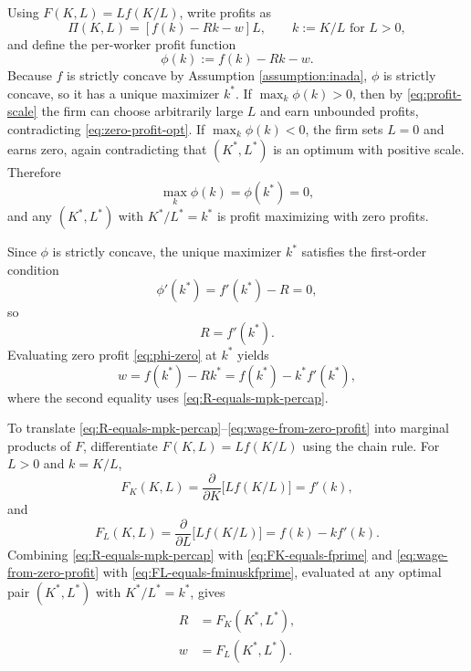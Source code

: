 \documentclass[\topdir/lecture\_notes.tex]{subfiles}
\begin{document}
Using \(F(K,L)=L f(K/L)\), write profits as
\begin{equation}
  \Pi(K,L)=[f(k)-Rk-w]L,\qquad k:=K/L \text{ for } L>0,
  \label{eq:profit-scale}
\end{equation}
and define the per-worker profit function
\begin{equation*}
  \phi(k):=f(k)-Rk-w.
\end{equation*}
Because \(f\) is strictly concave by Assumption \ref{assumption:inada}, \(\phi\) is strictly concave, so it has a unique maximizer \(k^{*}\).
If \(\max_{k}\phi(k)>0\), then by \eqref{eq:profit-scale} the firm can choose arbitrarily large \(L\) and earn unbounded profits, contradicting \eqref{eq:zero-profit-opt}.
If \(\max_{k}\phi(k)<0\), the firm sets \(L=0\) and earns zero, again contradicting that \((K^{*},L^{*})\) is an optimum with positive scale.
Therefore
\begin{equation}
  \max_{k}\phi(k)=\phi(k^{*})=0,
  \label{eq:phi-zero}
\end{equation}
and any \((K^{*},L^{*})\) with \(K^{*}/L^{*}=k^{*}\) is profit maximizing with zero profits.

Since \(\phi\) is strictly concave, the unique maximizer \(k^{*}\) satisfies the first-order condition
\begin{equation*}
  \phi'(k^{*})=f'(k^{*})-R=0,
\end{equation*}
so
\begin{equation}
  R=f'(k^{*}).
  \label{eq:R-equals-mpk-percap}
\end{equation}
Evaluating zero profit \eqref{eq:phi-zero} at \(k^{*}\) yields
\begin{equation}
  w=f(k^{*})-Rk^{*}=f(k^{*})-k^{*} f'(k^{*}),
  \label{eq:wage-from-zero-profit}
\end{equation}
where the second equality uses \eqref{eq:R-equals-mpk-percap}.

To translate \eqref{eq:R-equals-mpk-percap}--\eqref{eq:wage-from-zero-profit} into marginal products of \(F\), differentiate \(F(K,L)=L f(K/L)\) using the chain rule. For \(L>0\) and \(k=K/L\),
\begin{equation}
  F_{K}(K,L)=\frac{\partial}{\partial K}\big[L f(K/L)\big]=f'(k),
  \label{eq:FK-equals-fprime}
\end{equation}
and
\begin{equation}
  F_{L}(K,L)=\frac{\partial}{\partial L}\big[L f(K/L)\big]=f(k)-k f'(k).
  \label{eq:FL-equals-fminuskfprime}
\end{equation}
Combining \eqref{eq:R-equals-mpk-percap} with \eqref{eq:FK-equals-fprime} and \eqref{eq:wage-from-zero-profit} with \eqref{eq:FL-equals-fminuskfprime}, evaluated at any optimal pair \((K^{*},L^{*})\) with \(K^{*}/L^{*}=k^{*}\), gives
\begin{align}
  R & =F_{K}(K^{*},L^{*}),\label{eq:rental-rate} \\
  w & =F_{L}(K^{*},L^{*}).\label{eq:wage-rate}
\end{align}
\end{document}
